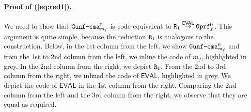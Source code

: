 \documentclass[a4paper,table,dvipsnames]{article}
\theoremstyle{definition}
\newcommand{\M}[1]{\ensuremath{\text{\texttt{#1}}}}
\renewcommand{\O}[1]{\ensuremath{\mathsf{#1}}}
\newcommand{\pcvar}[1]{\ensuremath{\mathit{#1}}}
\newcommand{\m}{\pcvar{m}} %
\begin{document}
\paragraph{Proof of (\ref{eq:red1}).}
We need to show that $\M{Gunf\text{-}cma}_{\m_f}^0$ is code-equivalent to $\M{R}_1\stackrel{\O{EVAL}}{\rightarrow}\M{Gprf}^0_f$.
This argument is quite simple, because the reduction $\M{R}_1$ is analogous to the construction.
Below, in the 1st column from the left, we show $\M{Gunf\text{-}cma}^0_{\m_f}$ and from the 1st to 2nd column
from the left, we inline the code of $\m_f$, highlighted in grey. In the 2nd column from the right, we 
depict $\M{R}_1$. From the 2nd to 3rd column from the right, we inlined the code of $\O{EVAL}$, highlighted
in grey. We depict the code of $\O{EVAL}$ in the 1st column from the right. Comparing the 2nd column from
the left and the 3rd column from the right, we observe that they are equal as required.
\end{document}
